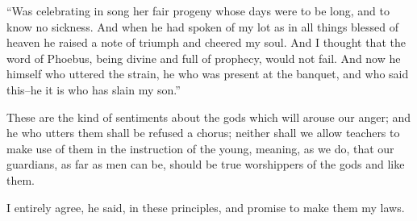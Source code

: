 ``Was celebrating in song her fair progeny whose days were to be long,
and to know no sickness. And when he had spoken of my lot as in all
things blessed of heaven he raised a note of triumph and cheered my
soul. And I thought that the word of Phoebus, being divine and full of
prophecy, would not fail. And now he himself who uttered the strain,
he who was present at the banquet, and who said this--he it is who has
slain my son.''

These are the kind of sentiments about the gods which will arouse our
anger; and he who utters them shall be refused a chorus; neither shall
we allow teachers to make use of them in the instruction of the young,
meaning, as we do, that our guardians, as far as men can be, should be
true worshippers of the gods and like them.

I entirely agree, he said, in these principles, and promise to make them
my laws.















